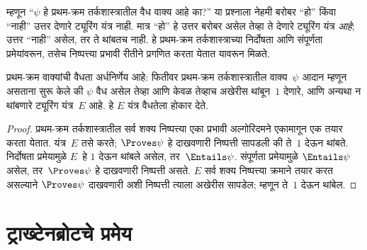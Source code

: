 \begin{explain}
म्हणून “$\psi$ हे प्रथम-क्रम
तर्कशास्त्रातील वैध वाक्य आहे का?” या प्रश्नाला
नेहमी बरोबर “हो” किंवा
“नाही” उत्तर देणारे
ट्यूरिंग यंत्र नाही. मात्र
“हो” हे उत्तर बरोबर असेल
तेव्हा ते देणारे ट्यूरिंग
यंत्र \emph{आहे}; उत्तर
“नाही” असेल, तर ते
थांबतच नाही. हे प्रथम-क्रम
तर्कशास्त्राच्या निर्दोषता आणि
संपूर्णता प्रमेयांवरून, तसेच
निष्पत्त्या प्रभावी
रीतीने प्रगणित करता येतात
यावरून मिळते.
\end{explain}

\begin{thm}
  \label{tur:und:uns:thm:valid-ce}
  प्रथम-क्रम वाक्यांची वैधता अर्धनिर्णेय आहे:
  फितीवर प्रथम-क्रम
  तर्कशास्त्रातील वाक्य~$\psi$ आदान म्हणून
  असताना सुरू केले की
  $\psi$ वैध असेल तेव्हा आणि केवळ तेव्हाच
  अखेरीस थांबून~$1$
  देणारे, आणि अन्यथा
  न थांबणारे ट्यूरिंग
  यंत्र~$E$ आहे. हे $E$
  यंत्र वैधतेला होकार देते.
\end{thm}

\begin{proof}
  प्रथम-क्रम तर्कशास्त्रातील
  सर्व शक्य निष्पत्त्या
  एका प्रभावी अल्गोरिदमने
  एकामागून एक तयार करता
  येतात. यंत्र~$E$ तसे
  करते; $\Proves
  \psi$ हे दाखवणारी
  निष्पत्ती
  सापडली की ते~$1$
  देऊन थांबते. निर्दोषता
  प्रमेयामुळे $E$~हे $1$
  देऊन थांबले असेल,
  तर~$\Entails \psi$.
  संपूर्णता प्रमेयामुळे
  $\Entails \psi$ असेल,
  तर~$\Proves \psi$
  हे दाखवणारी निष्पत्ती असते. $E$
  सर्व शक्य निष्पत्त्या
  क्रमाने तयार करत असल्याने
  $\Proves \psi$ दाखवणारी
  अशी निष्पत्ती त्याला
  अखेरीस सापडेल; म्हणून
  ते~$1$ देऊन थांबेल.
\end{proof}











\section{ट्राख्टेनब्रोटचे प्रमेय}\label{tur:und:tra:sec}


